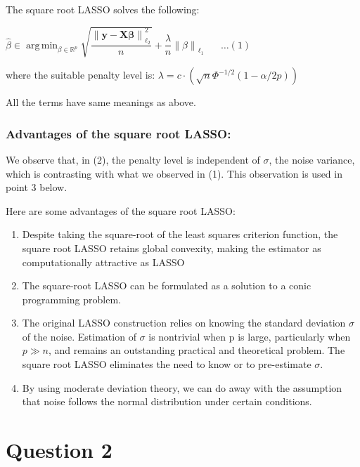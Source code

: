 \documentclass[fleqn, 11pt]{article}
\DeclareMathOperator*{\argmin}{arg\,min}
\newcommand{\bs}[1]{\boldsymbol{#1}}
\newcommand\norm[1]{\left\lVert#1\right\rVert}
\begin{document}
The square root LASSO solves the following: 

\begin{center}
    
$\hat{\beta} \in \displaystyle 
\argmin_{\beta \in \mathbb{R}^p} \sqrt{\dfrac{\norm{\bs{y-X \beta}}_{\ell_2}^2}{n}}
+ \dfrac{\lambda}{n} \norm{\beta}_{\ell_1}   \hspace{20pt}\ldots(1)   $

\end{center}

where the suitable penalty level is: $\lambda = c \cdot ( \sqrt{n} \Phi^{-1/2}(1-\alpha / 2p) ) $

All the terms have same meanings as above.

\subsubsection*{Advantages of the square root LASSO: }


We observe that, in (2), the penalty level is independent of $\sigma$, the noise variance, 
which is contrasting with what we observed in (1). This observation is used in point 3 below.

\medskip 

Here are some advantages of the square root LASSO:
\begin{enumerate}
    \item Despite taking the square-root of the least squares criterion function, the square root LASSO retains global convexity, making the estimator as computationally attractive as LASSO
    \item The square-root LASSO can be formulated as a solution to a conic programming problem.
    \item The original LASSO construction relies on knowing the standard deviation $\sigma$ of the noise. Estimation of $\sigma$  is nontrivial when p is large, particularly when $ p \gg n $, and remains an outstanding practical and theoretical problem. The square root LASSO eliminates the need to know or to pre-estimate $\sigma$. 
    \item By using moderate deviation theory, we can do away with the assumption that noise follows the normal distribution under certain conditions.
\end{enumerate}



\newpage
\section*{Question 2}
\setcounter{equation}{0}
\end{document}
